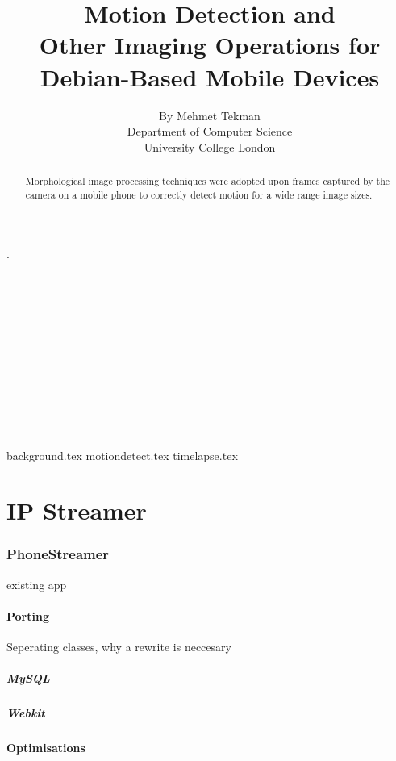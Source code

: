 \documentclass[11pt]{article} %
\title{\Huge Motion Detection and\\Other Imaging Operations for\\Debian-Based Mobile Devices }
\author{\small By Mehmet Tekman\\\small Department of Computer Science\\\small University College London}
\begin{document}
\maketitle 

\part*{}{\tiny .\\\\\\\\\\\\\\\\\\\\\\\\}

\begin{abstract}
 Morphological image processing techniques were adopted upon frames captured by the camera on a mobile phone to correctly detect motion for a wide range image sizes.
\end{abstract}

\pagebreak
\tableofcontents
\pagebreak

{background.tex}
{motiondetect.tex}
{timelapse.tex}

\part{IP Streamer}
\section{PhoneStreamer}{existing app}
\subsection{Porting}{Seperating classes, why a rewrite is neccesary}
\subsubsection{MySQL}
\subsubsection{Webkit}
\subsection{Optimisations}
\end{document}
